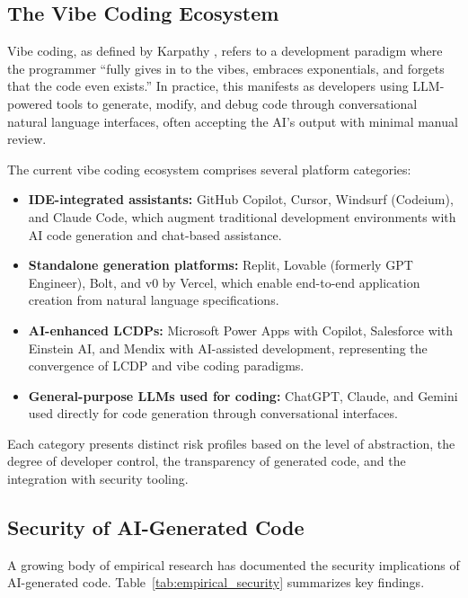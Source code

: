 \documentclass[preprint,review,12pt]{elsarticle}
\begin{document}
\subsection{The Vibe Coding Ecosystem}
\label{subsec:vibecoding}

Vibe coding, as defined by Karpathy \cite{karpathy2025vibe}, refers to a development paradigm where the programmer ``fully gives in to the vibes, embraces exponentials, and forgets that the code even exists.'' In practice, this manifests as developers using LLM-powered tools to generate, modify, and debug code through conversational natural language interfaces, often accepting the AI's output with minimal manual review.

The current vibe coding ecosystem comprises several platform categories:

\begin{itemize}
    \item \textbf{IDE-integrated assistants:} GitHub Copilot, Cursor, Windsurf (Codeium), and Claude Code, which augment traditional development environments with AI code generation and chat-based assistance.
    \item \textbf{Standalone generation platforms:} Replit, Lovable (formerly GPT Engineer), Bolt, and v0 by Vercel, which enable end-to-end application creation from natural language specifications.
    \item \textbf{AI-enhanced LCDPs:} Microsoft Power Apps with Copilot, Salesforce with Einstein AI, and Mendix with AI-assisted development, representing the convergence of LCDP and vibe coding paradigms.
    \item \textbf{General-purpose LLMs used for coding:} ChatGPT, Claude, and Gemini used directly for code generation through conversational interfaces.
\end{itemize}

Each category presents distinct risk profiles based on the level of abstraction, the degree of developer control, the transparency of generated code, and the integration with security tooling.

\subsection{Security of AI-Generated Code}
\label{subsec:aisecurity}

A growing body of empirical research has documented the security implications of AI-generated code. Table~\ref{tab:empirical_security} summarizes key findings.
\end{document}

